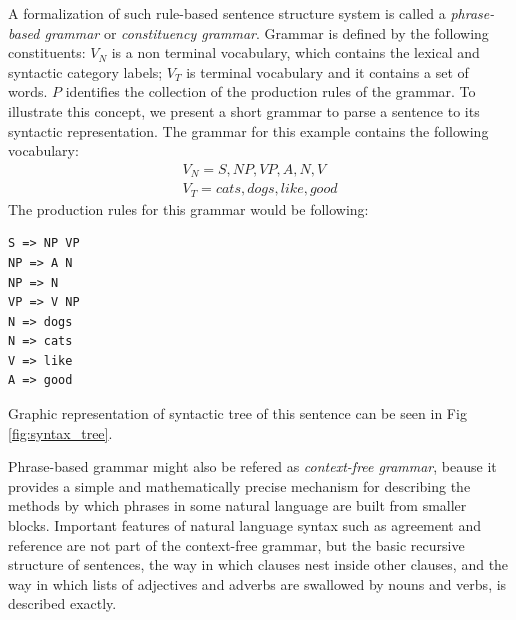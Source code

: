 A formalization of such rule-based sentence structure system is called a \emph{phrase-based grammar} or \emph{constituency grammar}. Grammar is defined by the following constituents:
$V_N$ is a non terminal vocabulary, which contains the lexical and syntactic category labels;
$V_T$ is terminal vocabulary and it contains a set of words.
$P$ identifies the collection of the production rules of the grammar.
To illustrate this concept, we present a short grammar to parse a sentence  to its syntactic representation. The grammar for this example contains the following vocabulary:
\begin{equation}
\begin{split}
V_N = {S, NP, VP, A, N, V}\\
V_T = {cats, dogs, like, good}
\end{split}
\end{equation}
The production rules for this grammar would be following:
\begin{verbatim}
S => NP VP
NP => A N
NP => N
VP => V NP
N => dogs
N => cats
V => like
A => good
\end{verbatim}
Graphic representation of syntactic tree  of this sentence can be seen in Fig \ref{fig:syntax_tree}.

Phrase-based grammar might also be refered as \emph{context-free grammar}, beause it provides a simple and mathematically precise mechanism for describing the methods by which phrases in some natural language are built from smaller blocks. Important features of natural language syntax such as agreement and reference are not part of the context-free grammar, but the basic recursive structure of sentences, the way in which clauses nest inside other clauses, and the way in which lists of adjectives and adverbs are swallowed by nouns and verbs, is described exactly.

